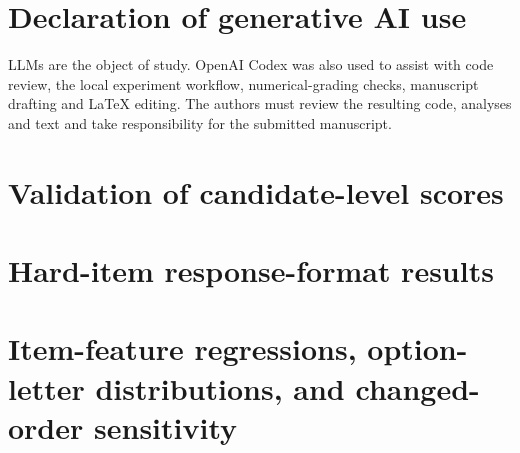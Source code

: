 \documentclass[preprint,12pt,authoryear,nonatbib]{elsarticle}
\begin{document}
\section*{Declaration of generative AI use}
LLMs are the object of study. OpenAI Codex was also used to assist with code review, the local experiment workflow, numerical-grading checks, manuscript drafting and LaTeX editing. The authors must review the resulting code, analyses and text and take responsibility for the submitted manuscript.

\ifdefined\APASeven
  \printbibliography
\else
  
  
\fi

\appendix
\renewcommand{\theHtable}{\Alph{section}.\arabic{table}}
\section{Validation of candidate-level scores}
\setcounter{table}{0}
\begin{table}[H]\centering\footnotesize
\caption{National means from S3 vs MOET published means}\label{tab:validation}

\end{table}

\section{Hard-item response-format results}
\setcounter{table}{0}
\begin{table}[H]\centering\footnotesize
\caption{Qwen2.5-7B with brief reasoning on audited S2 items; 95\% Wilson intervals (\%)}\label{tab:hardresults}

\end{table}

\begin{table}[H]\centering\footnotesize
\caption{Paired MCQ--open contrasts for Qwen2.5-7B; McNemar exact tests}\label{tab:hardgap}

\end{table}

\begin{table}[H]\centering\footnotesize
\caption{Qwen2.5-7B open-format mathematics accuracy by recorded paper year; 95\% Wilson intervals (\%)}\label{tab:hardyear}

\end{table}

\section{Item-feature regressions, option-letter distributions, and changed-order sensitivity}
\setcounter{table}{0}
\begin{table}[H]\centering\footnotesize
\caption{Multivariable logistic regressions of item correctness on S1 (1,700 items): adjusted odds ratios (95\% CI; $p$-value), controlling for subject fixed effects}\label{tab:logit}
\scriptsize\setlength{\tabcolsep}{4pt}

\end{table}
\end{document}

